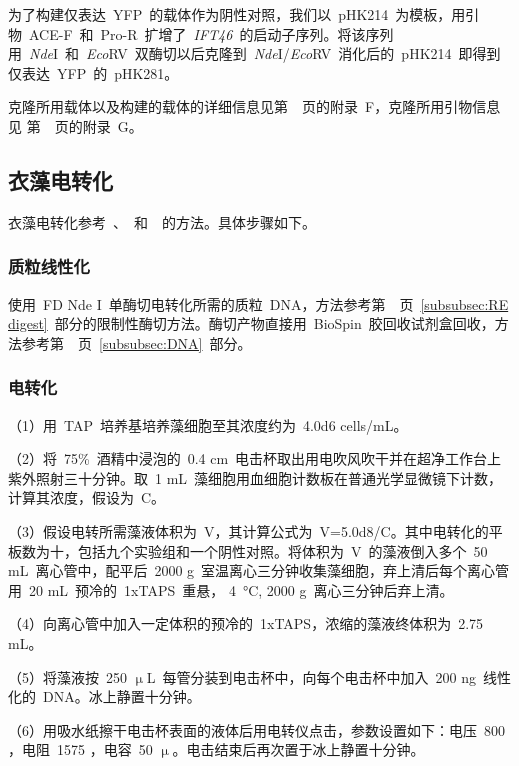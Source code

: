 为了构建仅表达\ YFP\ 的载体作为阴性对照，我们以\ pHK214\ 为模板，用引物\ ACE-F\ 和\ Pro-R\ 扩增了\ \textit{IFT46}\ 的启动子序列。将该序列用\ \textit{Nde}I\ 和\ \textit{Eco}RV\ 双酶切以后克隆到\ \textit{Nde}I/\textit{Eco}RV\ 消化后的\ pHK214\ 即得到仅表达\ YFP\ 的\ pHK281。

克隆所用载体以及构建的载体的详细信息见第\ \pageref{appen:F}\ 页的附录\ F，克隆所用引物信息见
第\ \pageref{appen:G}\ 页的附录\ G。

\subsection{衣藻电转化}\label{subsec:electrotransformation}
衣藻电转化参考\ \citet{Brown1991}、\citet{Hu2014}\ 和\ \citet{Shimogawara1998}\ 的方法。具体步骤如下。

\subsubsection{质粒线性化}
使用\ FD Nde I\ 单酶切电转化所需的质粒\ DNA，方法参考第\ \pageref{subsubsec:RE digest}\ 页\
\ref{subsubsec:RE digest}\ 部分的限制性酶切方法。酶切产物直接用\ BioSpin\ 胶回收试剂盒回收，方法参考第\
\pageref{subsubsec:DNA}\ 页\ \ref{subsubsec:DNA}\ 部分。
\subsubsection{电转化}
（1）用\ TAP\ 培养基培养藻细胞至其浓度约为\ \num{4.0d6} cells/mL。

（2）将\ 75\%\ 酒精中浸泡的\ 0.4 cm\ 电击杯取出用电吹风吹干并在超净工作台上紫外照射三十分钟。取\ 1 mL\ 藻细胞用血细胞计数板在普通光学显微镜下计数，计算其浓度，假设为\ C。

（3）假设电转所需藻液体积为\ V，其计算公式为\ V=\num{5.0d8}/C。其中电转化的平板数为十，包括九个实验组和一个阴性对照。将体积为\ V\ 的藻液倒入多个\ 50 mL\ 离心管中，配平后\ 2000 g\ 室温离心三分钟收集藻细胞，弃上清后每个离心管用\ 20 mL\ 预冷的\ 1xTAPS\ 重悬，
\SI{4}{\degreeCelsius}, 2000 g\ 离心三分钟后弃上清。

（4）向离心管中加入一定体积的预冷的\ 1xTAPS，浓缩的藻液终体积为\ 2.75 mL。

（5）将藻液按\ 250 $\upmu$L\ 每管分装到电击杯中，向每个电击杯中加入\ 200 ng\ 线性化的\ DNA。冰上静置十分钟。

（6）用吸水纸擦干电击杯表面的液体后用电转仪点击，参数设置如下：电压\ 800 \volt ，电阻\ 1575 \ohm ，电容\ 50 $\upmu$\farad 。电击结束后再次置于冰上静置十分钟。

